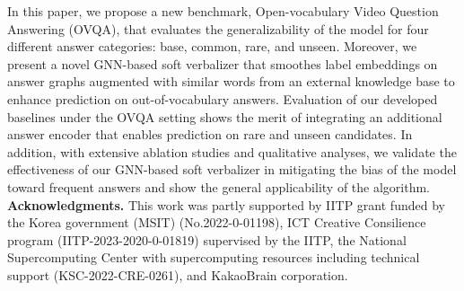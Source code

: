 \documentclass[10pt,twocolumn,letterpaper]{article}
\begin{document}
In this paper, we propose a new benchmark, Open-vocabulary Video Question Answering (OVQA), that evaluates the generalizability of the model for four different answer categories: base, common, rare, and unseen.
Moreover, we present a novel GNN-based soft verbalizer that smoothes label embeddings on answer graphs augmented with similar words from an external knowledge base to enhance prediction on out-of-vocabulary answers.
Evaluation of our developed baselines under the OVQA setting shows the merit of integrating an additional answer encoder that enables prediction on rare and unseen candidates. 
In addition, with extensive ablation studies and qualitative analyses, we validate the effectiveness of our GNN-based soft verbalizer in mitigating the bias of the model toward frequent answers and show the general applicability of the algorithm.  
\noindent \textbf{Acknowledgments.}
This work was partly supported by IITP grant funded by the Korea government (MSIT) (No.2022-0-01198), ICT Creative Consilience program (IITP-2023-2020-0-01819) supervised by the IITP, the National Supercomputing Center with supercomputing resources including technical support (KSC-2022-CRE-0261), and KakaoBrain corporation.
\newpage

{\small


}

\clearpage
\appendix
\end{document}
